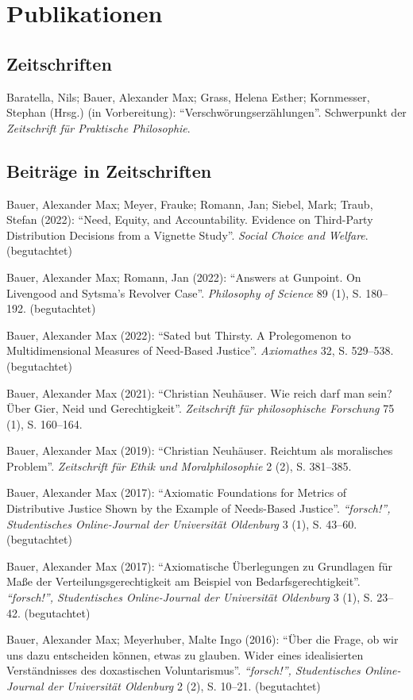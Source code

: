 \documentclass[a4paper,10pt]{article}
\newenvironment{literature}{%
   \parskip6pt\parindent0pt\raggedright
   \def\lititem{\hangindent=1cm\hangafter1}}{%
   \par\ignorespaces}
\begin{document}
\section{Publikationen}
\subsection*{Zeitschriften}
\begin{literature}
\lititem Baratella, Nils; Bauer, Alexander Max; Grass, Helena Esther; Kornmesser, Stephan (Hrsg.) (in Vorbereitung): \enquote{Verschwörungserzählungen}. Schwerpunkt der \textit{Zeitschrift für Praktische Philosophie}.
\end{literature}

\subsection*{Beiträge in Zeitschriften}
\begin{literature}
\lititem Bauer, Alexander Max; Meyer, Frauke; Romann, Jan; Siebel, Mark; Traub, Stefan (2022): \enquote{Need, Equity, and Accountability. Evidence on Third-Party Distribution Decisions from a Vignette Study}. \textit{Social Choice and Welfare}. (begutachtet)

\lititem Bauer, Alexander Max; Romann, Jan (2022): \enquote{Answers at Gunpoint. On Livengood and Sytsma's Revolver Case}. \textit{Philosophy of Science} 89 (1), S. 180--192. (begutachtet)

\lititem Bauer, Alexander Max (2022): \enquote{Sated but Thirsty. A Prolegomenon to Multidimensional Measures of Need-Based Justice}. \textit{Axiomathes} 32, S. 529--538. (begutachtet)

\lititem Bauer, Alexander Max (2021): \enquote{Christian Neuhäuser. Wie reich darf man
sein? Über Gier, Neid und Gerechtigkeit}. \textit{Zeitschrift für philosophische Forschung} 75 (1), S. 160--164.

\lititem Bauer, Alexander Max (2019): \enquote{Christian Neuhäuser. Reichtum als moralisches Problem}. \textit{Zeitschrift für Ethik und Moralphilosophie} 2 (2), S. 381--385.

\lititem Bauer, Alexander Max (2017): \enquote{Axiomatic Foundations for Metrics of Distributive Justice Shown by the Example of Needs-Based Justice}. \textit{\enquote{forsch!}, Studentisches Online-Journal der Universität Oldenburg} 3 (1), S. 43--60. (begutachtet)

\lititem Bauer, Alexander Max (2017): \enquote{Axiomatische Überlegungen zu Grundlagen für Maße der Verteilungsgerechtigkeit am Beispiel von Bedarfsgerechtigkeit}. \textit{\enquote{forsch!}, Studentisches Online-Journal der Universität Oldenburg} 3 (1), S. 23--42. (begutachtet)

\lititem Bauer, Alexander Max; Meyerhuber, Malte Ingo (2016): \enquote{Über die Frage, ob wir uns dazu entscheiden können, etwas zu glauben. Wider eines idealisierten Verständnisses des doxastischen Voluntarismus}. \textit{\enquote{forsch!}, Studentisches Online-Journal der Universität Oldenburg} 2 (2), S. 10--21. (begutachtet)
\end{literature}
\end{document}
